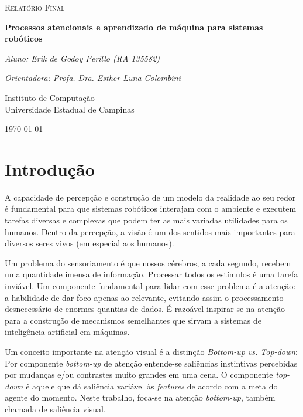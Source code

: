 \documentclass[11pt]{article}
\newcommand{\tit}[1]{\textit{#1}}
\begin{document}

\begin{titlepage}
	\centering
	{\scshape\Large Relatório Final\par}
	\vspace{1.5cm}
	{\huge\bfseries Processos atencionais e aprendizado de máquina
		para sistemas robóticos\par}
	\vspace{1cm}
    {\itshape Aluno: Erik de Godoy Perillo (RA 135582)\par}
	{\itshape Orientadora: Profa. Dra. Esther Luna Colombini\par}
	\vspace{0.5cm}
	\vfill
    Instituto de Computação\\
	Universidade Estadual de Campinas
	\vfill
	{\large \today\par}
\end{titlepage}

\newpage

\section{Introdução}
A capacidade de percepção e construção de um modelo da realidade ao seu redor
é fundamental para que sistemas robóticos interajam com o ambiente e executem
tarefas diversas e complexas que podem ter as mais variadas utilidades para
os humanos.
Dentro da percepção, a visão é um dos sentidos mais importantes para diversos
seres vivos (em especial aos humanos).

Um problema do sensoriamento é que nossos cérebros,
a cada segundo, recebem uma quantidade imensa de informação.
Processar todos os estímulos é uma tarefa inviável.
Um componente fundamental para lidar com esse problema é a atenção: a
habilidade de dar
foco apenas ao relevante, evitando assim o processamento desnecessário de
enormes quantias de dados.
É razoável inspirar-se na atenção para a construção de
mecanismos semelhantes que sirvam a sistemas de inteligência
artificial em máquinas.

Um conceito importante na atenção visual é a distinção
\tit{Bottom-up vs. Top-down}: Por componente \tit{bottom-up} de
atenção entende-se saliências instintivas percebidas por mudanças
e/ou contrastes muito grandes em uma cena. O componente \tit{top-down}
é aquele que dá saliência variável às \tit{features} de acordo
com a meta do agente do momento.
Neste trabalho, foca-se na atenção \tit{bottom-up}, também chamada de
saliência visual.
\end{document}
